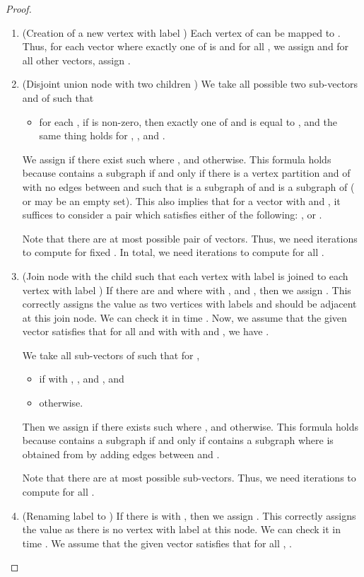 \documentclass[11pt]{article}
\theoremstyle{remark}
\begin{document}
\begin{proof}
\begin{enumerate}
\item (Creation of a new vertex  with label )
Each vertex of  can be mapped to . 
Thus, for each vector  where exactly one of  is  and  for all , 
we assign  and for all other vectors, assign .
\item (Disjoint union node with two children ) 
	We take all possible two sub-vectors  and  of  
	such that 
	\begin{itemize}
	\item for each , 
	if  is non-zero, then exactly one of  and  is equal to , and 
	the same thing holds for  , , and . 
	\end{itemize}	
We assign  if there exist such  where , 
and  otherwise.
	This formula holds because 
	 contains a subgraph  if and only if there is a vertex partition  and  of  with no edges between  and  such that
	 is a subgraph of  and  is a subgraph of  ( or  may be an empty set). 
	This also implies that for a vector  with  and , it suffices to consider a pair  which satisfies either of the following: 
	, or . 
	

	Note that there are at most  possible pair of vectors.
	Thus, we need  iterations to compute  for fixed .
	In total, we need  iterations to compute  for all . 
\item (Join node with the child  such that each vertex with label  is joined to each vertex with label )
      If there are  and  where  with ,  and 
      , then we assign . This correctly assigns the value as two vertices with labels  and  should be adjacent at this join node.
      We can check it in time .
      Now, we assume that the given vector  satisfies that for all  and  with  with  and ,
      we have  .
      
      We take all sub-vectors  of  
	such that for ,   
	\begin{itemize}
	\item  if  with ,  , and , and 
	\item  otherwise.
	\end{itemize} 
Then we assign  if there exists such  where , 
and  otherwise.
This formula holds because 
	 contains a subgraph  if and only if  contains a subgraph 
	where
	 is obtained from  by adding edges between  and .
		
   Note that there are at most  possible sub-vectors.
Thus, we need  iterations to compute  for all . 
      
\item  (Renaming label  to )
	If there is  with , then we assign . This correctly assigns the value as there is no vertex with label  at this node.
	 We can check it in time .
    We assume that the given vector  satisfies that 
    for all , .


\end{enumerate}
\end{proof}
\end{document}
